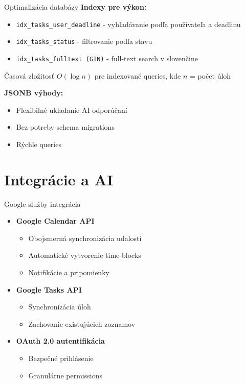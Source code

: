 \documentclass{beamer}
\begin{document}
\begin{frame}{Optimalizácia databázy}
\textbf{Indexy pre výkon:}
\begin{itemize}
\item \texttt{idx\_tasks\_user\_deadline} - vyhľadávanie podľa používateľa a deadlinu
\item \texttt{idx\_tasks\_status} - filtrovanie podľa stavu
\item \texttt{idx\_tasks\_fulltext (GIN)} - full-text search v slovenčine
\end{itemize}

\vspace{0.5cm}
\begin{block}{Časová zložitosť}
$O(\log n)$ pre indexované queries, kde $n$ = počet úloh
\end{block}

\vspace{0.3cm}
\textbf{JSONB výhody:}
\begin{itemize}
\item Flexibilné ukladanie AI odporúčaní
\item Bez potreby schema migrations
\item Rýchle queries
\end{itemize}
\end{frame}

\section{Integrácie a AI}

\begin{frame}{Google služby integrácia}
\begin{itemize}
\item \textbf{Google Calendar API}
  \begin{itemize}
  \item Obojsmerná synchronizácia udalostí
  \item Automatické vytvorenie time-blocks
  \item Notifikácie a pripomienky
  \end{itemize}
\item \textbf{Google Tasks API}
  \begin{itemize}
  \item Synchronizácia úloh
  \item Zachovanie existujúcich zoznamov
  \end{itemize}
\item \textbf{OAuth 2.0 autentifikácia}
  \begin{itemize}
  \item Bezpečné prihlásenie
  \item Granulárne permissions
  \end{itemize}
\end{itemize}
\end{frame}
\end{document}
